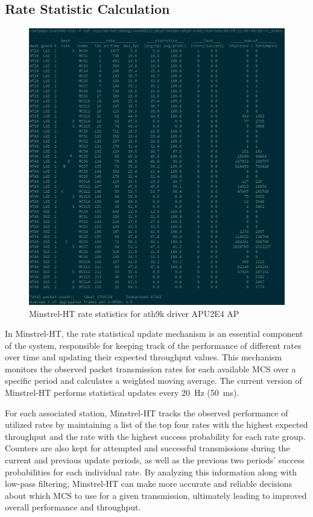 \subsection{Rate Statistic Calculation}
\label{intro:Rate Statistic Calculation}
\begin{figure}[htbp]
  \centering
  \includegraphics[width=\textwidth]{figures/stats.png}
  \caption[Minstrel-HT rate statistics]{Minstrel-HT rate statistics for ath9k driver APU2E4 AP  }
  \label{fig:rate_statistics}
\end{figure}


In Minstrel-HT, the rate statistical update mechanism is an essential component of the system, responsible for keeping track of the performance of different rates over time and updating their expected throughput values. This mechanism monitors the observed packet transmission rates for each available MCS over a specific period and calculates a weighted moving average. The current version of Minstrel-HT performs statistical updates every 20~Hz (50~ms).

For each associated station, Minstrel-HT tracks the observed performance of utilized rates by maintaining a list of the top four rates with the highest expected throughput and the rate with the highest success probability for each rate group. Counters are also kept for attempted and successful transmissions during the current and previous update periods, as well as the previous two periods' success probabilities for each individual rate. By analyzing this information along with low-pass filtering, Minstrel-HT can make more accurate and reliable decisions about which MCS to use for a given transmission, ultimately leading to improved overall performance and throughput.

